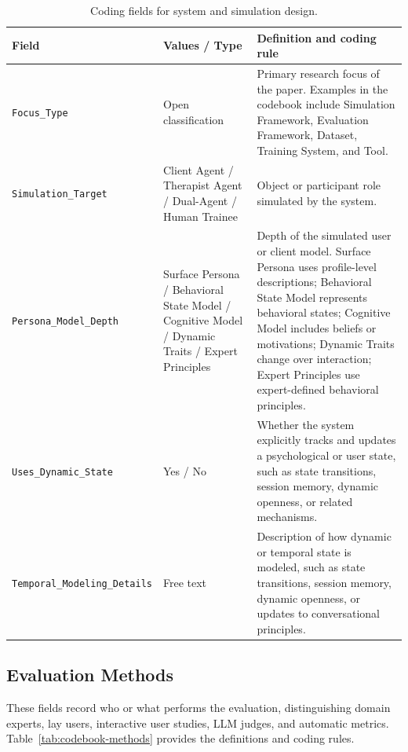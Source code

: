 \begin{table}[p]
\centering
\begin{tabular}{p{4.4cm}p{2.2cm}p{8.1cm}}
\toprule
\textbf{Field} & \textbf{Values / Type} & \textbf{Definition and coding rule} \\
\midrule

\texttt{Focus\_Type}
&
Open classification
&
Primary research focus of the paper. Examples in the codebook include Simulation Framework, Evaluation Framework, Dataset, Training System, and Tool.
\\
\midrule

\texttt{Simulation\_Target}
&
Client Agent / Therapist Agent / Dual-Agent / Human Trainee
&
Object or participant role simulated by the system.
\\
\midrule

\texttt{Persona\_Model\_Depth}
&
Surface Persona / Behavioral State Model / Cognitive Model / Dynamic Traits / Expert Principles
&
Depth of the simulated user or client model. Surface Persona uses profile-level descriptions; Behavioral State Model represents behavioral states; Cognitive Model includes beliefs or motivations; Dynamic Traits change over interaction; Expert Principles use expert-defined behavioral principles.
\\
\midrule

\texttt{Uses\_Dynamic\_State}
&
Yes / No
&
Whether the system explicitly tracks and updates a psychological or user state, such as state transitions, session memory, dynamic openness, or related mechanisms.
\\
\midrule

\texttt{Temporal\_Modeling\_Details}
&
Free text
&
Description of how dynamic or temporal state is modeled, such as state transitions, session memory, dynamic openness, or updates to conversational principles.
\\

\bottomrule
\end{tabular}
\caption{Coding fields for system and simulation design.}
\label{tab:codebook-system}
\end{table}


\subsection{Evaluation Methods}

These fields record who or what performs the evaluation, distinguishing domain experts, lay users, interactive user studies, LLM judges, and automatic metrics. 
Table~\ref{tab:codebook-methods} provides the definitions and coding rules.


